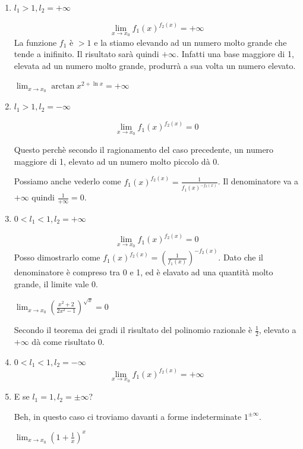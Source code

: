 \begin{enumerate}[label=\textbf{\arabic*})]
    \item $l_1>1, l_2=+\infty$
    
    \begin{equation}
        \lim_{x\to x_0}f_1(x)^{f_2(x)}=+\infty
    \end{equation}
    La funzione $f_1$ è $>1$ e la stiamo elevando ad un numero molto grande che tende a inifinito. Il risultato sarà quindi $+\infty$. Infatti una base maggiore di 1, elevata ad un numero molto grande, produrrà a sua volta un numero elevato.
    \begin{example}
        $\lim_{x\to x_0}\arctan x^{2+\ln x}=+\infty$
    \end{example}
    
    \item $l_1>1, l_2=-\infty$
    
    \begin{equation}
        \lim_{x\to x_0}f_1(x)^{f_2(x)}=0
    \end{equation}
    
    Questo perchè secondo il ragionamento del caso precedente, un numero maggiore di 1, elevato ad un numero molto piccolo dà 0.
    \begin{osservation}
        Possiamo anche vederlo come $f_1(x)^{f_2(x)}=\frac{1}{f_1(x)^{-f_2(x)}}$. Il denominatore va a $+\infty$ quindi $\frac{1}{+\infty}=0$.
    \end{osservation}
    
    \item $0<l_1<1, l_2=+\infty$
    
    \begin{equation}
        \lim_{x\to x_0}f_1(x)^{f_2(x)}=0
    \end{equation}
    Posso dimostrarlo come $f_1(x)^{f_2(x)}=(\frac{1}{f_1(x)})^{-f_2(x)}$. Dato che il denominatore è compreso tra 0 e 1, ed è elavato ad una quantità molto grande, il limite vale 0.
    \begin{example}
        $\lim_{x\to x_0}(\frac{x^2+2}{2x^2-1})^{\sqrt{x}}=0$
        
        Secondo il teorema dei gradi il risultato del polinomio razionale è $\frac{1}{2}$, elevato a $+\infty$ dà come risultato 0.
    \end{example}
    
    \item $0<l_1<1, l_2=-\infty$
    \begin{equation}
        \lim_{x\to x_0}f_1(x)^{f_2(x)}=+\infty
    \end{equation}
    
    \item E se $l_1=1, l_2=\pm\infty$?
    
    Beh, in questo caso ci troviamo davanti a forme indeterminate $1^{\pm\infty}$.
    \begin{example}
        $\lim_{x\to x_0}(1+\frac{1}{x})^x$
    \end{example}
\end{enumerate}

